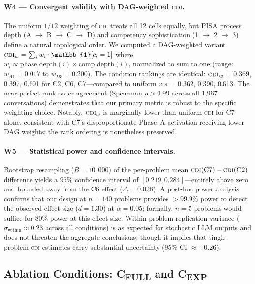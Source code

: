 \documentclass{article}
\newcommand{\CDI}{\textsc{cdi}}
\begin{document}
\paragraph{W4 — Convergent validity with DAG-weighted \CDI.}
The uniform $1/12$ weighting of \CDI{} treats all 12 cells equally,
but PISA process depth (A $\to$ B $\to$ C $\to$ D) and competency
sophistication (1 $\to$ 2 $\to$ 3) define a natural topological order.
We computed a DAG-weighted variant $\CDI_w = \sum_{i} w_i \cdot
\mathbb{1}[c_i = 1]$ where $w_i \propto \text{phase\_depth}(i) \times
\text{comp\_depth}(i)$, normalized to sum to one (range: $w_{A1} =
0.017$ to $w_{D3} = 0.200$). The condition rankings are identical:
$\CDI_w$ = 0.369, 0.397, 0.601 for C2, C6, C7---compared to uniform
\CDI{} = 0.362, 0.390, 0.613. The near-perfect rank-order agreement
(Spearman $\rho > 0.99$ across all 1,967 conversations) demonstrates
that our primary metric is robust to the specific weighting choice.
Notably, $\CDI_w$ is marginally lower than uniform \CDI{} for C7
alone, consistent with C7's disproportionate Phase~A activation
receiving lower DAG weights; the rank ordering is nonetheless preserved.

\paragraph{W5 — Statistical power and confidence intervals.}
Bootstrap resampling ($B = 10{,}000$) of the per-problem mean
$\CDI(\text{C7}) - \CDI(\text{C2})$ difference yields a $95\%$
confidence interval of $[0.219, 0.284]$---entirely above zero and
bounded away from the C6 effect ($\Delta = 0.028$). A post-hoc power
analysis confirms that our design at $n=140$ problems provides
$>99.9\%$ power to detect the observed effect size ($d = 1.30$) at
$\alpha = 0.05$; formally, $n = 5$ problems would suffice for $80\%$
power at this effect size. Within-problem replication variance
($\sigma_{\text{within}} \approx 0.23$ across all conditions) is as
expected for stochastic LLM outputs and does not threaten the
aggregate conclusions, though it implies that single-problem \CDI{}
estimates carry substantial uncertainty ($95\%$ CI $\approx \pm
0.26$).

\subsection{Ablation Conditions: C\textsubscript{FULL} and C\textsubscript{EXP}}
\label{sec:ablations}
\end{document}
